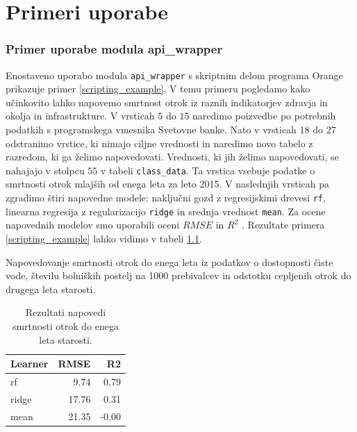 \chapter{Primeri uporabe}




\subsection{Primer uporabe modula api\_wrapper}

Enostaveno uporabo modula \verb|api_wrapper| s skriptnim delom programa Orange
prikazuje primer \ref{scripting_example}. V temu primeru pogledamo kako
učinkovito lahko napovemo smrtnost otrok iz raznih indikatorjev zdravja in
okolja in infrastrukture. V vrsticah $5$ do $15$ naredimo poizvedbe po
potrebnih podatkih s programskega vmesnika Svetovne banke. Nato v vrsticah $18$
do $27$ odstranimo vrstice, ki nimajo ciljne vrednosti in naredimo novo tabelo z
razredom, ki ga želimo napovedovati. Vrednosti, ki jih želimo napovedovati, se
nahajajo v stolpcu $55$ v tabeli \verb|class_data|. Ta vrstica vsebuje podatke
o smrtnosti otrok mlajših od enega leta za leto 2015. V naslednjih vrsticah
pa zgradimo štiri napovedne modele: naključni gozd z
regresijskimi drevesi \verb|rf|, linearna regresija z regularizacijo 
\verb|ridge| in srednja vrednost \verb|mean|.
Za ocene napovednih modelov smo uporabili oceni
$RMSE$  in 
$R^2$ .
Rezultate primera \ref{scripting_example} lahko vidimo v tabeli 
\ref{rezultati_skripte}.


\begin{snippet}
\begin{center}

\end{center}
\cprotect
\caption{Napovedovanje smrtnosti otrok do enega leta iz podatkov o dostopnosti
  čiste vode, številu bolniških postelj na 1000 prebivalcev in odstotku
  cepljenih otrok do drugega leta starosti.}
\label{scripting_example}
\end{snippet} 

\begin{table}
\begin{center}

\begin{tabular}{l|r|r}
  Learner & RMSE & R2      \\ \hline
 
  rf & 9.74 & 0.79 \\
  ridge & 17.76 & 0.31 \\
  mean & 21.35 & -0.00

\end{tabular}
\end{center}
\cprotect
\caption{Rezultati napovedi smrtnosti otrok do enega leta starosti.}
\label{rezultati_skripte}
\end{table} 



